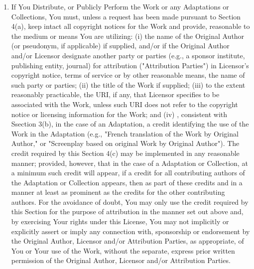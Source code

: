 \documentclass[10pt]{book}
\begin{document}
\begin{enumerate}
	\item If You Distribute, or Publicly Perform the Work or           any Adaptations or Collections, You must, unless a           request has been made pursuant to Section 4(a), keep           intact all copyright notices for the Work and provide,           reasonable to the medium or means You are utilizing: (i)           the name of the Original Author (or pseudonym, if           applicable) if supplied, and/or if the Original Author           and/or Licensor designate another party or parties (e.g.,           a sponsor institute, publishing entity, journal) for           attribution ("Attribution Parties") in Licensor's           copyright notice, terms of service or by other reasonable           means, the name of such party or parties; (ii) the title           of the Work if supplied; (iii) to the extent reasonably           practicable, the URI, if any, that Licensor specifies to           be associated with the Work, unless such URI does not           refer to the copyright notice or licensing information           for the Work; and (iv) , consistent with Ssection 3(b),           in the case of an Adaptation, a credit identifying the           use of the Work in the Adaptation (e.g., "French           translation of the Work by Original Author," or           "Screenplay based on original Work by Original Author").           The credit required by this Section 4(c) may be           implemented in any reasonable manner; provided, however,           that in the case of a Adaptation or Collection, at a           minimum such credit will appear, if a credit for all           contributing authors of the Adaptation or Collection           appears, then as part of these credits and in a manner at           least as prominent as the credits for the other           contributing authors. For the avoidance of doubt, You may           only use the credit required by this Section for the           purpose of attribution in the manner set out above and,           by exercising Your rights under this License, You may not           implicitly or explicitly assert or imply any connection           with, sponsorship or endorsement by the Original Author,           Licensor and/or Attribution Parties, as appropriate, of           You or Your use of the Work, without the separate,           express prior written permission of the Original Author,           Licensor and/or Attribution Parties.

\end{enumerate}
\end{document}
